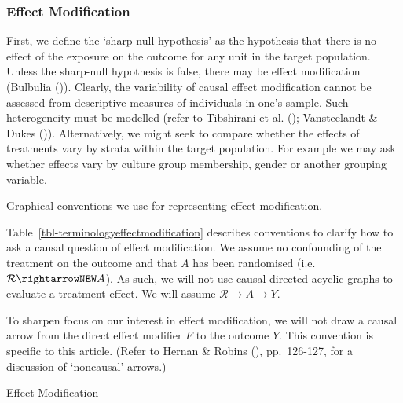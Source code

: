 \documentclass[
  single column]{article}
\begin{document}
\subsubsection{Effect Modification}\label{effect-modification}

First, we define the `sharp-null hypothesis' as the hypothesis that
there is no effect of the exposure on the outcome for any unit in the
target population. Unless the sharp-null hypothesis is false, there may
be effect modification (Bulbulia
()). Clearly, the variability of
causal effect modification cannot be assessed from descriptive measures
of individuals in one's sample. Such heterogeneity must be modelled
(refer to Tibshirani et al. (); Vansteelandt
\& Dukes ()). Alternatively, we
might seek to compare whether the effects of treatments vary by strata
within the target population. For example we may ask whether effects
vary by culture group membership, gender or another grouping variable.

\begin{table}

\caption{\label{tbl-terminologyeffectmodification}Graphical conventions
we use for representing effect modification.}

\centering{

\terminologyeffectmodification

}

\end{table}%

Table~\ref{tbl-terminologyeffectmodification} describes conventions to
clarify how to ask a causal question of effect modification. We assume
no confounding of the treatment on the outcome and that \(A\) has been
randomised (i.e.~\(\mathcal{R} \rightarrowNEW A\)). As such, we will not
use causal directed acyclic graphs to evaluate a treatment effect. We
will assume \(\mathcal{R}  \to A \to Y\).

To sharpen focus on our interest in effect modification, we will not
draw a causal arrow from the direct effect modifier \(F\) to the outcome
\(Y\). This convention is specific to this article. (Refer to Hernan \&
Robins (), pp.~126-127, for a
discussion of `noncausal' arrows.)

\begin{table}

\caption{\label{tbl-terminologyeffectmodificationtypes}Effect
Modification}

\centering{

\terminologyeffectmodificationtypes

}

\end{table}%
\end{document}
